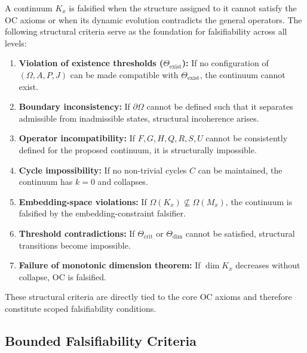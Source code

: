 A continuum $K_x$ is falsified when the structure assigned to it
cannot satisfy the OC axioms or when its dynamic evolution contradicts
the general operators.
The following structural criteria serve as the foundation for
falsifiability across all levels:

\begin{enumerate}
    \item \textbf{Violation of existence thresholds ($\Theta_{\mathrm{exist}}$):}
          If no configuration of $(\Omega, A, P, J)$ can be made compatible
          with $\Theta_{\mathrm{exist}}$, the continuum cannot exist.

    \item \textbf{Boundary inconsistency:}
          If $\partial\Omega$ cannot be defined such that it separates
          admissible from inadmissible states, structural incoherence arises.

    \item \textbf{Operator incompatibility:}
          If $F, G, H, Q, R, S, U$ cannot be consistently defined for the
          proposed continuum, it is structurally impossible.

    \item \textbf{Cycle impossibility:}
          If no non-trivial cycles $C$ can be maintained, the continuum has
          $k=0$ and collapses.

    \item \textbf{Embedding-space violations:}
          If $\Omega(K_x) \not\subseteq \Omega(M_x)$, the continuum is
          falsified by the embedding-constraint falsifier.

    \item \textbf{Threshold contradictions:}
          If $\Theta_{\mathrm{crit}}$ or $\Theta_{\mathrm{dim}}$ cannot be
          satisfied, structural transitions become impossible.

    \item \textbf{Failure of monotonic dimension theorem:}
          If $\dim K_x$ decreases without collapse, OC is falsified.
\end{enumerate}

These structural criteria are directly tied to the core OC axioms and
therefore constitute scoped falsifiability conditions.



\subsection{Bounded Falsifiability Criteria}

